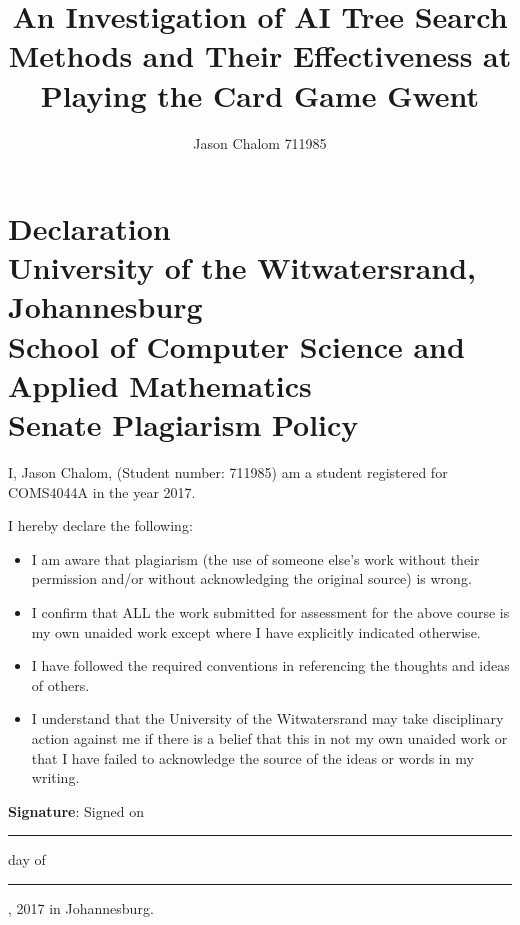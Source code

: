 \documentclass[journal]{IEEEtran}
\title{An Investigation of AI Tree Search Methods and Their Effectiveness at Playing the Card Game Gwent}
\author{Jason Chalom 711985 %
}
\begin{document}
\onecolumn
%

\section*{\textbf{Declaration\\
University of the Witwatersrand, Johannesburg\\
School of Computer Science and Applied Mathematics\\
Senate Plagiarism Policy}}  
\vskip 1cm
I, Jason Chalom, (Student number: 711985) am a student registered for 
COMS4044A in the year 2017.

I hereby declare the following: 
\begin{itemize}
\item
I am aware that plagiarism (the use of someone else's work without their permission and/or without acknowledging the original source) is wrong. 
\item
I confirm that ALL the work submitted for assessment for the above course is my own unaided work except where I have explicitly indicated otherwise. 
\item
I have followed the required conventions in referencing the 
thoughts and ideas of others.
\item
I understand that the University of the Witwatersrand may take 
disciplinary action against me if there is a belief that this in not my own unaided work or that I have failed to acknowledge the source of the ideas or words in my writing.  
\end{itemize}
\vskip 1cm
\noindent
\textbf{Signature}: 
\hspace{2cm}
\vskip 6mm
\noindent
Signed on \rule{3cm}{0.4pt} day of \rule{3cm}{0.4pt} , 2017 in Johannesburg.
\end{document}
